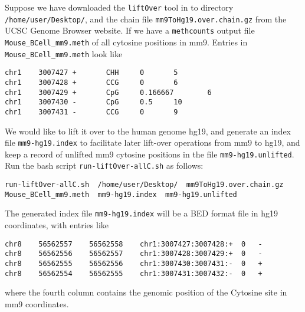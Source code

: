 \documentclass[10pt]{article}
\newcommand{\prog}[1]{\texttt{#1}}
\newcommand{\fn}[1]{\texttt{#1}}
\begin{document}
Suppose we have downloaded the \prog{liftOver} tool in to directory
\fn{/home/user/Desktop/}, and the chain file
\fn{mm9ToHg19.over.chain.gz} from the UCSC Genome Browser website.  If
we have a \prog{methcounts} output file \fn{Mouse\_BCell\_mm9.meth}
of all cytosine positions in mm9. Entries in
\fn{Mouse\_BCell\_mm9.meth} look like
\begin{verbatim}
chr1    3007427 +       CHH     0       5
chr1    3007428 +       CCG     0       6
chr1    3007429 +       CpG     0.166667        6
chr1    3007430 -       CpG     0.5     10
chr1    3007431 -       CCG     0       9
\end{verbatim}

We would like to lift it over to the human genome hg19, and generate
an index file \fn{mm9-hg19.index} to facilitate later lift-over
operations from mm9 to hg19, and keep a record of unlifted mm9
cytosine positions in the file \fn{mm9-hg19.unlifted}. Run the bash
script \fn{run-liftOver-allC.sh} as follows:
\begin{verbatim}
run-liftOver-allC.sh  /home/user/Desktop/  mm9ToHg19.over.chain.gz  Mouse_BCell_mm9.meth  mm9-hg19.index  mm9-hg19.unlifted
\end{verbatim}

The generated index file \fn{mm9-hg19.index} will be a BED format
file in hg19 coordinates, with entries like
\begin{verbatim}
chr8	56562557	56562558	chr1:3007427:3007428:+	0	-
chr8	56562556	56562557	chr1:3007428:3007429:+	0	-
chr8	56562555	56562556	chr1:3007430:3007431:-	0	+
chr8	56562554	56562555	chr1:3007431:3007432:-	0	+
\end{verbatim}
where the fourth column contains the genomic position of the Cytosine
site in mm9 coordinates.
\end{document}
